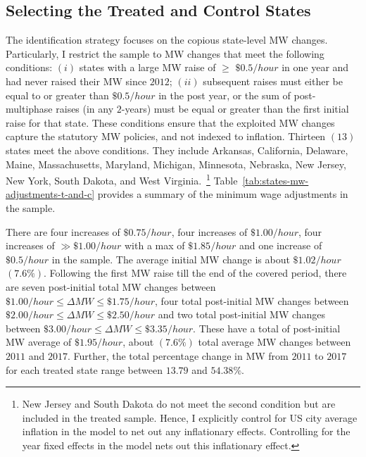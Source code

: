 \documentclass[authoryear, preprint, twocolumn, 1p]{elsarticle}
\begin{document}
    \subsection{Selecting the Treated and Control States}\label{subsec:selecting-the-treated-and-control-states}
    The identification strategy focuses on the copious state-level MW changes. Particularly, I restrict the sample to MW changes that meet the following conditions: $(i)$ states with a large MW raise of $\geq$ $\$0.5/hour$ in one year and had never raised their MW since $2012$; $(ii)$ subsequent raises must either be equal to or greater than $\$0.5/hour$ in the post year, or the sum of post-multiphase raises (in any $2$-years) must be equal or greater than the first initial raise for that state. These conditions ensure that the exploited MW changes capture the statutory MW policies, and not indexed to inflation. Thirteen $(13)$ states meet the above conditions. They include Arkansas, California, Delaware, Maine, Massachusetts, Maryland, Michigan, Minnesota, Nebraska, New Jersey, New York, South Dakota, and West Virginia.~\footnote{\tiny New Jersey and South Dakota do not meet the second condition but are included in the treated sample. Hence, I explicitly control for US city average inflation in the model to net out any inflationary effects. Controlling for the year fixed effects in the model nets out this inflationary effect.} Table~\ref{tab:states-mw-adjustments-t-and-c} provides a summary of the minimum wage adjustments in the sample.

    There are four increases of $\$0.75/hour$, four increases of $\$1.00/hour$, four increases of $\gg\$1.00/hour$ with a max of $\$1.85/hour$ and one increase of $\$0.5/hour$ in the sample. The average initial MW change is about $\$1.02/hour$ $(7.6\%)$. Following the first MW raise till the end of the covered period, there are seven post-initial total MW changes between $\$1.00/hour \leq \Delta MW \leq \$1.75/hour$, four total post-initial MW changes between $\$2.00/hour \leq \Delta MW \leq \$2.50/hour$ and two total post-initial MW changes between $\$3.00/hour \leq \Delta MW \leq \$3.35/hour$. These have a total of post-initial MW average of $\$1.95/hour$, about $(7.6\%)$ total average MW changes between $2011$ and $2017$. Further, the total percentage change in MW from $2011$ to $2017$ for each treated state range between $13.79$ and $54.38\%$.
    
\end{document}
